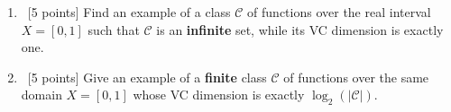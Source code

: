 \begin{enumerate}
\begin{enumerate}
  \item ~[5 points] Find an example of a class $\mathcal{C}$ of
    functions over the real interval $X = [0,1]$ such that
    $\mathcal{C}$ is an {\bf infinite} set, while its VC dimension is
    exactly one.

  \item ~[5 points] Give an example of a {\bf finite} class
    $\mathcal{C}$ of functions over the same domain $X = [0,1]$ whose
    VC dimension is exactly $\log_2(|\mathcal{C}|)$.

  \end{enumerate}
  
\end{enumerate}

